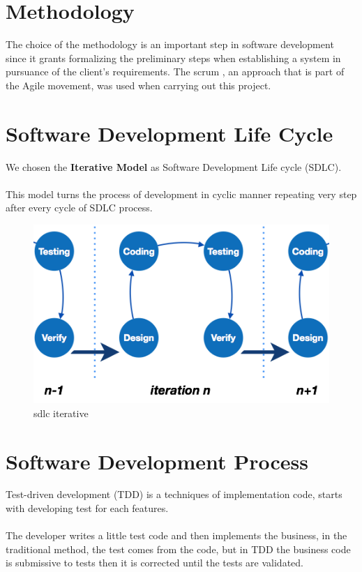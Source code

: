 \documentclass[12pt]{article}
\begin{document}
	\section{Methodology}
	The choice of the methodology is an important step in software development since it grants formalizing the preliminary steps when establishing a system in pursuance of the client’s requirements.
	The scrum , an approach that is part of the Agile movement, was used when carrying out this project.
	
	\newpage
	
	\section{Software Development Life Cycle}
	We chosen the \textbf{Iterative Model }as Software Development Life cycle (SDLC).
	\\
	\\
	This model turns the process of development in cyclic manner repeating very step after every cycle of SDLC process. 
	
	\begin{figure}[h]
		\centering
		\includegraphics[width=1\textwidth]{sdlc_iterative.png}
		\caption{sdlc iterative}
	\end{figure}  

	\newpage

	\section{Software Development Process}
	Test-driven development (TDD) is a techniques of implementation code, starts with developing test for each features. 
	\\
	\\
	The developer writes a little test code and then implements the business, in the traditional method, the test comes from the code, but in TDD the business code is submissive to tests then it is corrected until the tests are validated. 
	
\end{document}
